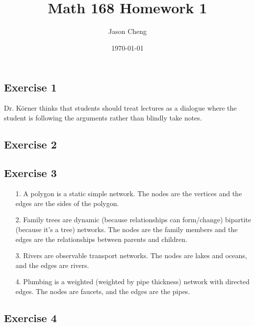 \documentclass{article}
\title{Math 168 Homework 1}
\author{Jason Cheng}
\date{\today}
\begin{document}
\maketitle

\subsection*{Exercise 1}

Dr. Körner thinks that students should treat lectures as a dialogue where the
student is following the arguments rather than blindly take notes.

\newpage

\subsection*{Exercise 2}

\newpage

\subsection*{Exercise 3}

\begin{enumerate}
  \item[1.]
  A polygon is a static simple network. The nodes are the vertices and the edges
  are the sides of the polygon.
  
  \item[2.]
  Family trees are dynamic (because relationships can form/change) bipartite
  (because it's a tree) networks. The nodes are the family members and the edges
  are the relationships between parents and children.

  \item[3.]
  Rivers are observable transport networks. The nodes are lakes and oceans, and
  the edges are rivers.

  \item[4.]
  Plumbing is a weighted (weighted by pipe thickness) network with directed
  edges. The nodes are faucets, and the edges are the pipes.
\end{enumerate}

\newpage

\subsection*{Exercise 4}
\end{document}
